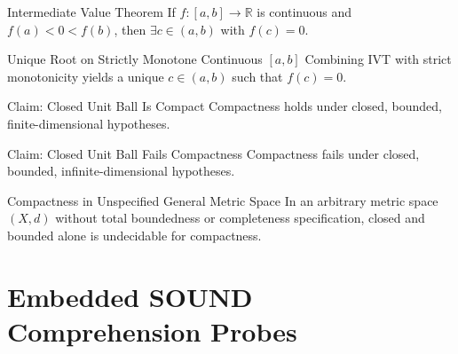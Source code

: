\documentclass[11pt]{article}
\begin{document}
\begin{soundtheorem}[id=thm_ivt]{Intermediate Value Theorem}
\label{thm:ivt}
If $f: [a,b] \to \mathbb{R}$ is continuous and $f(a) < 0 < f(b)$, then $\exists c \in (a,b)$ with $f(c) = 0$.
\end{soundtheorem}

\begin{soundcorollary}[id=cor_unique_root]{Unique Root on Strictly Monotone Continuous $[a,b]$}
\label{cor:unique}
Combining IVT with strict monotonicity yields a unique $c \in (a,b)$ such that $f(c) = 0$.
\end{soundcorollary}

\begin{soundrule}[id=claim_hb_compact]{Claim: Closed Unit Ball Is Compact}
\label{claim:hb_pos}
Compactness holds under closed, bounded, finite-dimensional hypotheses.
\end{soundrule}

\begin{soundrule}[id=claim_hb_noncomp]{Claim: Closed Unit Ball Fails Compactness}
\label{claim:hb_neg}
Compactness fails under closed, bounded, infinite-dimensional hypotheses.
\end{soundrule}

\begin{soundpenumbra}[id=pen_metric_compact]{Compactness in Unspecified General Metric Space}
\label{pen:metric}
In an arbitrary metric space $(X,d)$ without total boundedness or completeness specification, closed and bounded alone is undecidable for compactness.
\end{soundpenumbra}


\section{Embedded SOUND Comprehension Probes}
\end{document}
